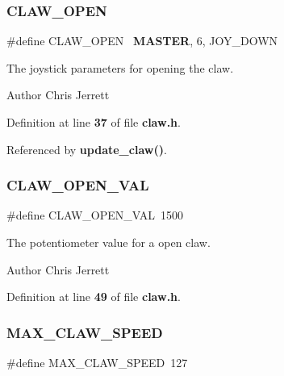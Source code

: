 \subsubsection{C\+L\+A\+W\+\_\+\+O\+P\+EN}
{\footnotesize\ttfamily \#define C\+L\+A\+W\+\_\+\+O\+P\+EN~\textbf{ M\+A\+S\+T\+ER}, 6, J\+O\+Y\+\_\+\+D\+O\+WN}



The joystick parameters for opening the claw. 

\begin{DoxyAuthor}{Author}
Chris Jerrett 
\end{DoxyAuthor}


Definition at line \textbf{ 37} of file \textbf{ claw.\+h}.



Referenced by \textbf{ update\+\_\+claw()}.

\mbox{\label{claw_8h_a519372d8dfa1706d706053ab035ea0b9}} 
\subsubsection{C\+L\+A\+W\+\_\+\+O\+P\+E\+N\+\_\+\+V\+AL}
{\footnotesize\ttfamily \#define C\+L\+A\+W\+\_\+\+O\+P\+E\+N\+\_\+\+V\+AL~1500}



The potentiometer value for a open claw. 

\begin{DoxyAuthor}{Author}
Chris Jerrett 
\end{DoxyAuthor}


Definition at line \textbf{ 49} of file \textbf{ claw.\+h}.

\mbox{\label{claw_8h_ae3be50b28977dac719f086e131ba8fd7}} 
\subsubsection{M\+A\+X\+\_\+\+C\+L\+A\+W\+\_\+\+S\+P\+E\+ED}
{\footnotesize\ttfamily \#define M\+A\+X\+\_\+\+C\+L\+A\+W\+\_\+\+S\+P\+E\+ED~127}




